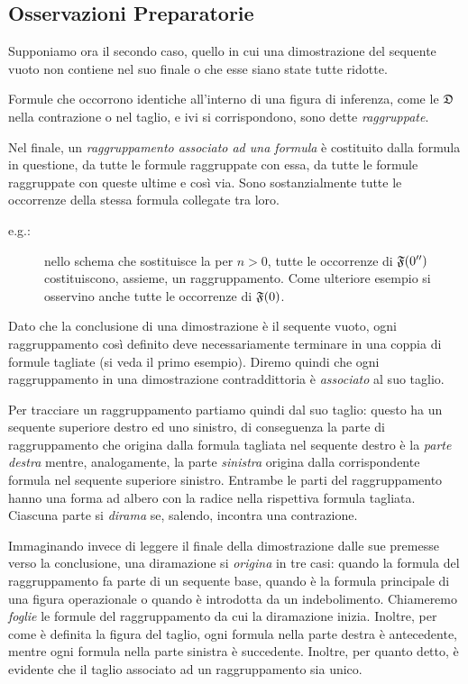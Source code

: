 	\subsection{Osservazioni Preparatorie}
		Supponiamo ora il secondo caso, quello in cui una dimostrazione del sequente vuoto non contiene  nel suo finale o che esse siano state tutte ridotte.
	\begin{defin}
		Formule che occorrono identiche all'interno di una figura di inferenza, come le $\mathfrak{D}$ nella contrazione o nel taglio, e ivi si corrispondono, sono dette \emph{raggruppate}.
	\end{defin}
	\begin{defin}
		Nel finale, un \emph{raggruppamento associato ad una formula} è costituito dalla formula in questione, da tutte le formule raggruppate con essa, da tutte le formule raggruppate con queste ultime e così via. Sono sostanzialmente tutte le occorrenze della stessa formula collegate tra loro.
	\end{defin}
	\begin{description}
		\item[e.g.:] nello schema che sostituisce la  per $n>0$, tutte le occorrenze di $\mathfrak{F}(0'')$ costituiscono, assieme, un raggruppamento. Come ulteriore esempio si osservino anche tutte le occorrenze di $\mathfrak{F}(0)$.
	\end{description}
		Dato che la conclusione di una dimostrazione è il sequente vuoto, ogni raggruppamento così definito deve necessariamente terminare in una coppia di formule tagliate (si veda il primo esempio). Diremo quindi che ogni raggruppamento in una dimostrazione contraddittoria è \emph{associato} al suo taglio.
		
		Per tracciare un raggruppamento partiamo quindi dal suo taglio: questo ha un sequente superiore destro ed uno sinistro, di conseguenza la parte di raggruppamento che origina dalla formula tagliata nel sequente destro è la \emph{parte destra} mentre, analogamente, la parte \emph{sinistra} origina dalla corrispondente formula nel sequente superiore sinistro. Entrambe le parti del raggruppamento hanno una forma ad albero con la radice nella rispettiva formula tagliata. Ciascuna parte si \emph{dirama} se, salendo, incontra una contrazione. 
		
		Immaginando invece di leggere il finale della dimostrazione dalle sue premesse verso la conclusione, una diramazione si \emph{origina} in tre casi: quando la formula del raggruppamento fa parte di un sequente base, quando è la formula principale di una figura operazionale o quando è introdotta da un indebolimento. Chiameremo \emph{foglie} le formule del raggruppamento da cui la diramazione inizia. Inoltre, per come è definita la figura del taglio, ogni formula nella parte destra è antecedente, mentre ogni formula nella parte sinistra è succedente. Inoltre, per quanto detto, è evidente che il taglio associato ad un raggruppamento sia unico.
		
